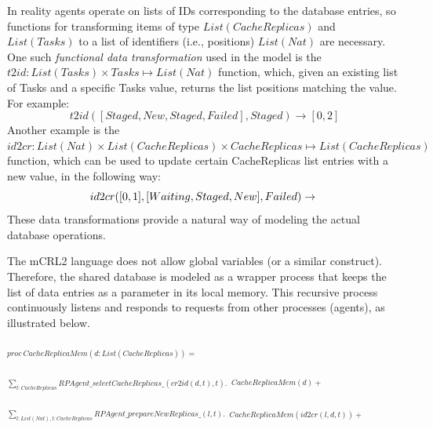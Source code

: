 \documentclass[10pt,conference]{IEEEtran}
\begin{document}
In reality agents operate on lists of IDs corresponding to the database
entries, so functions for transforming items of type \begin{math}List(CacheReplicas)\end{math}
and \begin{math}List(Tasks)\end{math}
to a list of identifiers (i.e., positions) 
\begin{math}List(Nat)\end{math} are necessary.
One such \textit{functional data transformation} used in the model is the 
$t2id:List(Tasks)\times Tasks\mapsto List(Nat)$ function, which,
given an existing list of Tasks and a specific Tasks value, returns the list positions
 matching the value.
For example:
\begin{displaymath}
t2id([Staged,New,Staged,Failed],Staged)\rightarrow [0,2] 
\end{displaymath}
Another example is the 
$id2cr:List(Nat)\times List(CacheReplicas)\times CacheReplicas\mapsto List(CacheReplicas)$                                                                                                
function, which can be used to update certain CacheReplicas list entries with a new value, in the following way:
\begin{displaymath}
id2cr([0,1],[Waiting,Staged,New],Failed) \\
 \rightarrow \\
\end{displaymath}
\begin{displaymath}
[Failed,Failed,New]
\end{displaymath}
These data transformations provide a natural way of modeling
the actual database operations.

The mCRL2 language does not allow global variables (or a similar construct).
Therefore, the shared database is modeled as a wrapper process
that keeps the list of data entries as a parameter in its local memory. This
recursive process continuously listens and responds
to requests from other processes (agents), as illustrated below.

$_{proc\ CacheReplicaMem(d:List(CacheReplicas)) = }$

$_{\sum_{t:CacheReplicas} RPAgent\_selectCacheReplicas\_(cr2id(d,t),t). } $
$_{CacheReplicaMem(d) +}$

$_{\sum_{l:List(Nat),t:CacheReplicas} RPAgent\_prepareNewReplicas\_(l,t).}$
$_{CacheReplicaMem(id2cr(l,d,t))+}$
\end{document}
